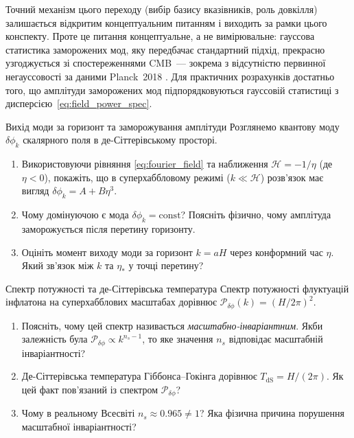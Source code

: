 Точний механізм цього переходу (вибір базису вказівників, роль довкілля)
залишається відкритим концептуальним питанням і виходить за рамки цього конспекту.
Проте це питання концептуальне, а не вимірювальне: гауссова статистика заморожених
мод, яку передбачає стандартний підхід, прекрасно узгоджується зі спостереженнями
CMB~--- зокрема з відсутністю первинної негауссовості за даними Planck~2018
\cite{planck_2018}.
Для практичних розрахунків достатньо того, що амплітуди заморожених мод
підпорядковуються гауссовій статистиці з дисперсією~\eqref{eq:field_power_spec}.


\begin{problem}{Вихід моди за горизонт та заморожування амплітуди}
Розглянемо квантову моду $\delta\phi_k$ скалярного поля в де-Сіттерівському просторі.

\begin{enumerate}
    \item Використовуючи рівняння \eqref{eq:fourier_field} та наближення
          $\mathcal{H} = -1/\eta$ (де $\eta < 0$), покажіть, що в суперхаббловому
          режимі ($k \ll \mathcal{H}$) розв'язок має вигляд $\delta\phi_k = A + B\eta^3$.
    \item Чому домінуючою є мода $\delta\phi_k = \mathrm{const}$? Поясніть фізично,
          чому амплітуда заморожується після перетину горизонту.
    \item Оцініть момент виходу моди за горизонт $k = aH$ через конформний час $\eta$.
          Який зв'язок між $k$ та $\eta_*$ у точці перетину?
\end{enumerate}
\end{problem}


\begin{problem}{Спектр потужності та де-Сіттерівська температура}
Спектр потужності флуктуацій інфлатона на суперхабблових масштабах дорівнює
$\mathcal{P}_{\delta\phi}(k) = (H/2\pi)^2$.

\begin{enumerate}
    \item Поясніть, чому цей спектр називається \emph{масштабно-інваріантним}.
          Якби залежність була $\mathcal{P}_{\delta\phi} \propto k^{n_s-1}$, то яке
          значення $n_s$ відповідає масштабній інваріантності?
    \item Де-Сіттерівська температура Гіббонса--Гокінга дорівнює $T_{\mathrm{dS}} = H/(2\pi)$.
          Як цей факт пов'язаний із спектром $\mathcal{P}_{\delta\phi}$?
    \item Чому в реальному Всесвіті $n_s \approx 0.965 \neq 1$? Яка фізична причина
          порушення масштабної інваріантності?
\end{enumerate}
\end{problem}

